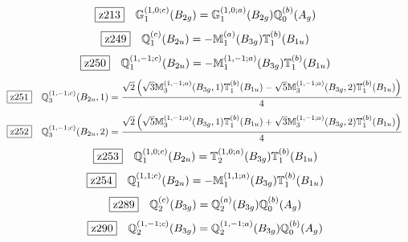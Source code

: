 \documentclass[fleqn,10pt,landscape]{jsarticle}
\begin{document}
\begin{dmath*}
\hspace*{3mm}\fbox{z213}\quad \mathbb{G}_{1}^{(1,0;c)}(B_{2g})=\mathbb{G}_{1}^{(1,0;a)}(B_{2g}) \mathbb{Q}_{0}^{(b)}(A_{g})
\end{dmath*}
\begin{dmath*}
\hspace*{3mm}\fbox{z249}\quad \mathbb{Q}_{1}^{(c)}(B_{2u})=- \mathbb{M}_{1}^{(a)}(B_{3g}) \mathbb{T}_{1}^{(b)}(B_{1u})
\end{dmath*}
\begin{dmath*}
\hspace*{3mm}\fbox{z250}\quad \mathbb{Q}_{1}^{(1,-1;c)}(B_{2u})=- \mathbb{M}_{1}^{(1,-1;a)}(B_{3g}) \mathbb{T}_{1}^{(b)}(B_{1u})
\end{dmath*}
\begin{dmath*}
\hspace*{3mm}\fbox{z251}\quad \mathbb{Q}_{3}^{(1,-1;c)}(B_{2u},1)=\frac{\sqrt{2} \left(\sqrt{3} \mathbb{M}_{3}^{(1,-1;a)}(B_{3g},1) \mathbb{T}_{1}^{(b)}(B_{1u}) - \sqrt{5} \mathbb{M}_{3}^{(1,-1;a)}(B_{3g},2) \mathbb{T}_{1}^{(b)}(B_{1u})\right)}{4}
\end{dmath*}
\begin{dmath*}
\hspace*{3mm}\fbox{z252}\quad \mathbb{Q}_{3}^{(1,-1;c)}(B_{2u},2)=\frac{\sqrt{2} \left(\sqrt{5} \mathbb{M}_{3}^{(1,-1;a)}(B_{3g},1) \mathbb{T}_{1}^{(b)}(B_{1u}) + \sqrt{3} \mathbb{M}_{3}^{(1,-1;a)}(B_{3g},2) \mathbb{T}_{1}^{(b)}(B_{1u})\right)}{4}
\end{dmath*}
\begin{dmath*}
\hspace*{3mm}\fbox{z253}\quad \mathbb{Q}_{1}^{(1,0;c)}(B_{2u})=\mathbb{T}_{2}^{(1,0;a)}(B_{3g}) \mathbb{T}_{1}^{(b)}(B_{1u})
\end{dmath*}
\begin{dmath*}
\hspace*{3mm}\fbox{z254}\quad \mathbb{Q}_{1}^{(1,1;c)}(B_{2u})=- \mathbb{M}_{1}^{(1,1;a)}(B_{3g}) \mathbb{T}_{1}^{(b)}(B_{1u})
\end{dmath*}
\begin{dmath*}
\hspace*{3mm}\fbox{z289}\quad \mathbb{Q}_{2}^{(c)}(B_{3g})=\mathbb{Q}_{2}^{(a)}(B_{3g}) \mathbb{Q}_{0}^{(b)}(A_{g})
\end{dmath*}
\begin{dmath*}
\hspace*{3mm}\fbox{z290}\quad \mathbb{Q}_{2}^{(1,-1;c)}(B_{3g})=\mathbb{Q}_{2}^{(1,-1;a)}(B_{3g}) \mathbb{Q}_{0}^{(b)}(A_{g})
\end{dmath*}
\end{document}
